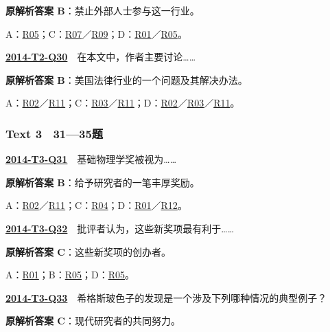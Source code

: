 \documentclass[11pt,a4paper]{article}
\begin{document}
\noindent\textbf{原解析答案 B}：禁止外部人士参与这一行业。\par\nopagebreak
\noindent A：\hyperref[cat-R05]{R05}；C：\hyperref[cat-R07]{R07}／\hyperref[cat-R09]{R09}；D：\hyperref[cat-R01]{R01}／\hyperref[cat-R05]{R05}。\par\smallskip
{}\label{idx-2014-T2-Q30}\noindent\textbf{\href{https://zj139.github.io/math-notes/english/8f6f7a5e65fac14d43f1506b/\#q30}{2014-T2-Q30}}　在本文中，作者主要讨论……\par\nopagebreak
\noindent\textbf{原解析答案 B}：美国法律行业的一个问题及其解决办法。\par\nopagebreak
\noindent A：\hyperref[cat-R02]{R02}／\hyperref[cat-R11]{R11}；C：\hyperref[cat-R03]{R03}／\hyperref[cat-R11]{R11}；D：\hyperref[cat-R02]{R02}／\hyperref[cat-R03]{R03}／\hyperref[cat-R11]{R11}。\par\smallskip
\clearpage
{}\subsubsection{Text 3　31—35题}
\label{idx-2014-T3-Q31}\noindent\textbf{\href{https://zj139.github.io/math-notes/english/ec4f22a05d5f681f24385a88/\#q31}{2014-T3-Q31}}　基础物理学奖被视为……\par\nopagebreak
\noindent\textbf{原解析答案 B}：给予研究者的一笔丰厚奖励。\par\nopagebreak
\noindent A：\hyperref[cat-R02]{R02}／\hyperref[cat-R11]{R11}；C：\hyperref[cat-R04]{R04}；D：\hyperref[cat-R01]{R01}／\hyperref[cat-R12]{R12}。\par\smallskip
{}\label{idx-2014-T3-Q32}\noindent\textbf{\href{https://zj139.github.io/math-notes/english/ec4f22a05d5f681f24385a88/\#q32}{2014-T3-Q32}}　批评者认为，这些新奖项最有利于……\par\nopagebreak
\noindent\textbf{原解析答案 C}：这些新奖项的创办者。\par\nopagebreak
\noindent A：\hyperref[cat-R01]{R01}；B：\hyperref[cat-R05]{R05}；D：\hyperref[cat-R05]{R05}。\par\smallskip
{}\label{idx-2014-T3-Q33}\noindent\textbf{\href{https://zj139.github.io/math-notes/english/ec4f22a05d5f681f24385a88/\#q33}{2014-T3-Q33}}　希格斯玻色子的发现是一个涉及下列哪种情况的典型例子？\par\nopagebreak
\noindent\textbf{原解析答案 C}：现代研究者的共同努力。\par\nopagebreak
\end{document}
